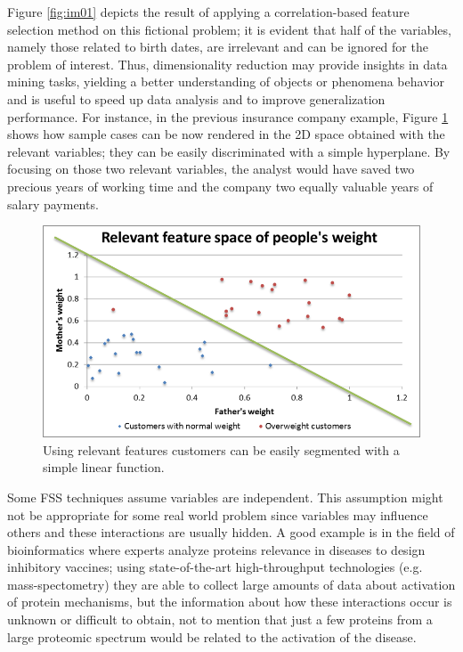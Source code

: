 Figure \ref{fig:im01} depicts the result of applying a correlation-based feature selection method on this fictional problem; it is evident that half of the variables, namely those related to birth dates, are irrelevant and can be ignored for the problem of interest. Thus, dimensionality reduction may provide insights in data mining tasks, yielding a better understanding of objects or phenomena behavior and is useful to speed up data analysis and to improve generalization performance. For instance, in the previous insurance company example, Figure \ref{fig:im08} shows how sample cases can be now rendered in the 2D space obtained with the relevant variables; they can be easily discriminated with a simple hyperplane. By focusing on those two relevant variables, the analyst would have saved two precious years of working time and the company two equally valuable years of salary payments. 

\begin{figure}[h]
	\centering
		\includegraphics{Images/example02.png}
	\caption{Using relevant features customers can be easily segmented with a simple linear function.}
	\label{fig:im08}
\end{figure}

Some FSS techniques assume variables are independent.  This assumption might not be appropriate for some real world problem since variables may influence others and these interactions are usually hidden.  A good example is in the field of bioinformatics where experts analyze proteins relevance in diseases to design inhibitory vaccines; using state-of-the-art high-throughput technologies (e.g. mass-spectometry\cite{lipton08}) they are able to collect large amounts of data about activation of protein mechanisms, but the information about how these interactions occur is unknown or difficult to obtain, not to mention that just a few proteins from a large proteomic spectrum would be related to the activation of the disease. 

